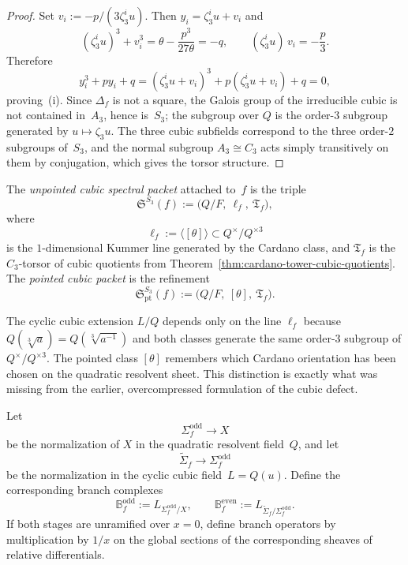\begin{proof}
Set $v_i:=-p/(3\zeta_3^i u)$.  Then
$y_i=\zeta_3^i u+v_i$ and
\[
(\zeta_3^i u)^3+v_i^3
=\theta-\frac{p^3}{27\theta}
=-q,
\qquad
(\zeta_3^i u)\,v_i=-\frac{p}{3}.
\]
Therefore
\[
y_i^3+py_i+q
=(\zeta_3^i u+v_i)^3+p(\zeta_3^i u+v_i)+q=0,
\]
proving~(i).  Since $\Delta_f$ is not a square, the Galois group of the
irreducible cubic is not contained in~$A_3$, hence is~$S_3$; the subgroup over
$Q$ is the order-$3$ subgroup generated by $u\mapsto \zeta_3 u$.  The three
cubic subfields correspond to the three order-$2$ subgroups of~$S_3$, and the
normal subgroup $A_3\cong C_3$ acts simply transitively on them by conjugation,
which gives the torsor structure.
\end{proof}

\begin{definition}
\label{def:cubic-spectral-packet}
The \emph{unpointed cubic spectral packet} attached to~$f$ is the triple
\[
\mathfrak S^{S_3}(f):=
\bigl(Q/F,\ \ell_f,\ \mathfrak T_f\bigr),
\]
where
\[
\ell_f:=\langle[\theta]\rangle\subset Q^{\times}/Q^{\times 3}
\]
is the $1$-dimensional Kummer line generated by the Cardano class, and
$\mathfrak T_f$ is the $C_3$-torsor of cubic quotients from
Theorem~\ref{thm:cardano-tower-cubic-quotients}.  The \emph{pointed cubic
packet} is the refinement
\[
\mathfrak S^{S_3}_{\mathrm{pt}}(f):=
\bigl(Q/F,\ [\theta],\ \mathfrak T_f\bigr).
\]
\end{definition}

\begin{remark}
\label{rem:line-vs-class}
The cyclic cubic extension $L/Q$ depends only on the line $\ell_f$ because
$Q(\sqrt[3]{a})=Q(\sqrt[3]{a^{-1}})$ and both classes generate the same order-$3$
subgroup of $Q^{\times}/Q^{\times 3}$.  The pointed class $[\theta]$ remembers
which Cardano orientation has been chosen on the quadratic resolvent sheet.
This distinction is exactly what was missing from the earlier, overcompressed
formulation of the cubic defect.
\end{remark}

\begin{construction}
\label{cons:odd-even-covers}
Let
\[
\Sigma^{\mathrm{odd}}_f\to X
\]
be the normalization of $X$ in the quadratic resolvent field~$Q$, and let
\[
\widetilde\Sigma_f\to \Sigma^{\mathrm{odd}}_f
\]
be the normalization in the cyclic cubic field~$L=Q(u)$.  Define the
corresponding branch complexes
\[
\mathbb B^{\mathrm{odd}}_f:=L_{\Sigma^{\mathrm{odd}}_f/X},
\qquad
\mathbb B^{\mathrm{even}}_f:=L_{\widetilde\Sigma_f/\Sigma^{\mathrm{odd}}_f}.
\]
If both stages are unramified over $x=0$, define branch operators by
multiplication by $1/x$ on the global sections of the corresponding sheaves of
relative differentials.
\end{construction}


